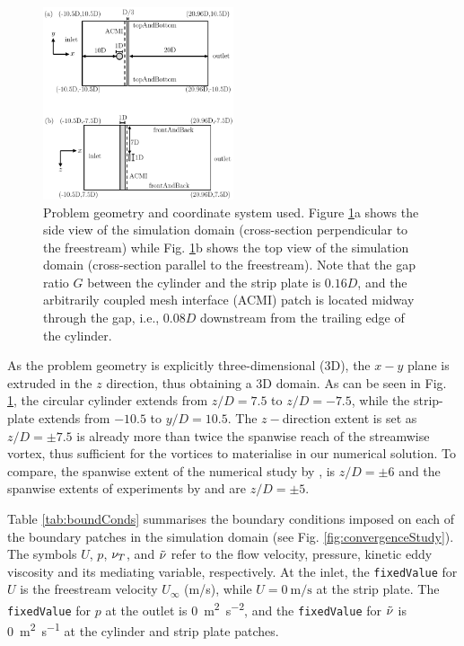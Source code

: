 \documentclass[a4paper,fleqn]{cas-sc}
\begin{document}
\begin{figure}
  \centering
  \includegraphics[width=0.5\textwidth]{figs/figure2}
  \caption{Problem geometry and coordinate system used. Figure \ref{fig:problemGeometry}a shows the side view of the simulation domain (cross-section perpendicular to the freestream) while Fig. \ref{fig:problemGeometry}b shows the top view of the simulation domain (cross-section parallel to the freestream). Note that the gap ratio $G$ between the cylinder and the strip plate is $0.16D$, and the arbitrarily coupled mesh interface (ACMI) patch is located midway through the gap, i.e., $0.08D$ downstream from the trailing edge of the cylinder.}
  \label{fig:problemGeometry}
\end{figure}

As the problem geometry is explicitly three-dimensional (3D), the $x-y$ plane is extruded in the $z$ direction, thus obtaining a 3D domain. As can be seen in Fig. \ref{fig:problemGeometry}, the circular cylinder extends from $z/D=7.5$ to $z/D=-7.5$, while the strip-plate extends from $-10.5$ to $y/D=10.5$. The $z-$direction extent is set as $z/D=\pm7.5$ is already more than twice the spanwise reach of the streamwise vortex, thus sufficient for the vortices to materialise in our numerical solution. To compare, the spanwise extent of the numerical study by \citet{Deng2007}, is $z/D=\pm6$ and the spanwise extents of experiments by \citet{Nguyen2012} and \citet{Koide2013} are $z/D=\pm5$.

\color{blue}
Table \ref{tab:boundConds} summarises the boundary conditions imposed on each of the boundary patches in the simulation domain (see Fig. \ref{fig:convergenceStudy}). The symbols $U$, $p$, $\nu_{T}$, and $\tilde{\nu}$ refer to the flow velocity, pressure, kinetic eddy viscosity and its mediating variable, respectively. At the inlet, the \verb|fixedValue| for $U$ is the freestream velocity $U_{\infty}$ (\si[per-mode=symbol]{\metre\per\second}), while $U = \SI[per-mode=symbol]{0}{\metre\per\second}$ at the strip plate. The \verb|fixedValue| for $p$ at the outlet is \SI[per-mode=symbol]{0}{\square\metre\per\square\second}, and the \verb|fixedValue| for $\tilde{\nu}$ is \SI[per-mode=symbol]{0}{\square\metre\per\second} at the cylinder and strip plate patches.
\end{document}
